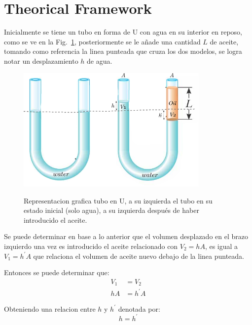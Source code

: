 \section{Theorical Framework}



Inicialmente se tiene un tubo en forma de U con agua en su interior en reposo, como se ve en la Fig.~\ref{u-tube-master}, posteriormente se le añade una cantidad $L$ de aceite, tomando como referencia la linea punteada que cruza los dos modelos, se logra notar un desplazamiento $h$ de agua.

\begin{figure}[h]
  \begin{center}
  \includegraphics[width=3.7in]{photo/u-tube-example-final.png}\\
  \caption{Representacion grafica tubo en U, a su izquierda el tubo en su estado inicial (solo agua), a su izquierda después de haber introducido el aceite.}\label{u-tube-master}
  \end{center}
\end{figure}

Se puede determinar en base a lo anterior que el volumen desplazado en el brazo izquierdo una vez es introducido el aceite relacionado con $V_2 = hA$,  es igual a $V_1 = h^{\prime}A$ que relaciona el volumen de aceite nuevo debajo de la linea punteada.

Entonces se puede determinar que:
\begin{align*}
V_1 &= V_2 \\
hA  &=  h^{\prime}A 
\end{align*}

Obteniendo una relacion entre $h$ y $h^{\prime}$ denotada por:
\begin{equation}
\label{relacion_aches}
        h = h^{\prime}       
\end{equation}

